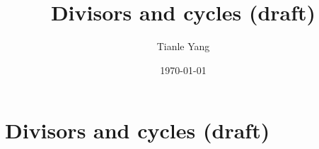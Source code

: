 \documentclass{noteformyself}
\title{Divisors and cycles (draft)}
\author{Tianle Yang}
\date{\today}
\begin{document}
    \maketitle

    \section{Divisors and cycles (draft)}

    

\end{document}

